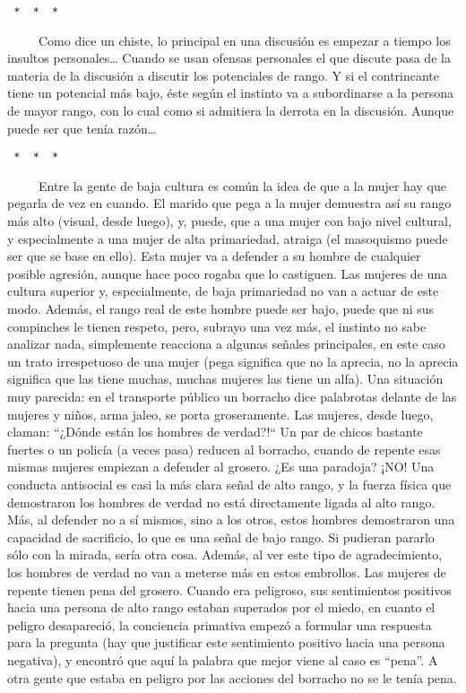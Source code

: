 \begin{verbatim}
 *  *  * 
\end{verbatim}

~ ~ ~ Como dice un chiste, lo principal en una discusión es empezar a
tiempo los insultos personales\ldots{} Cuando se usan ofensas personales
el que discute pasa de la materia de la discusión a discutir los
potenciales de rango. Y si el contrincante tiene un potencial más bajo,
éste según el instinto va a subordinarse a la persona de mayor rango,
con lo cual como si admitiera la derrota en la discusión. Aunque puede
ser que tenía razón\ldots{}

\begin{verbatim}
 *  *  * 
\end{verbatim}

~ ~ ~ Entre la gente de baja cultura es común la idea de que a la mujer
hay que pegarla de vez en cuando. El marido que pega a la mujer
demuestra así su rango más alto (visual, desde luego), y, puede, que a
una mujer con bajo nivel cultural, y especialmente a una mujer de alta
primariedad, atraiga (el masoquismo puede ser que se base en ello). Esta
mujer va a defender a su hombre de cualquier posible agresión, aunque
hace poco rogaba que lo castiguen. Las mujeres de una cultura superior
y, especialmente, de baja primariedad no van a actuar de este modo.
Además, el rango real de este hombre puede ser bajo, puede que ni sus
compinches le tienen respeto, pero, subrayo una vez más, el instinto no
sabe analizar nada, simplemente reacciona a algunas señales principales,
en este caso un trato irrespetuoso de una mujer (pega significa que no
la aprecia, no la aprecia significa que las tiene muchas, muchas mujeres
las tiene un alfa). Una situación muy parecida: en el transporte público
un borracho dice palabrotas delante de las mujeres y niños, arma jaleo,
se porta groseramente. Las mujeres, desde luego, claman: ``¿Dónde están
los hombres de verdad?!`` Un par de chicos bastante fuertes o un policía
(a veces pasa) reducen al borracho, cuando de repente esas mismas
mujeres empiezan a defender al grosero. ¿Es una paradoja? ¡NO! Una
conducta antisocial es casi la más clara señal de alto rango, y la
fuerza física que demostraron los hombres de verdad no está directamente
ligada al alto rango. Más, al defender no a sí mismos, sino a los otros,
estos hombres demostraron una capacidad de sacrificio, lo que es una
señal de bajo rango. Si pudieran pararlo sólo con la mirada, sería otra
cosa. Además, al ver este tipo de agradecimiento, los hombres de verdad
no van a meterse más en estos embrollos. Las mujeres de repente tienen
pena del grosero. Cuando era peligroso, sus sentimientos positivos hacia
una persona de alto rango estaban superados por el miedo, en cuanto el
peligro desapareció, la conciencia primativa empezó a formular una
respuesta para la pregunta (hay que justificar este sentimiento positivo
hacia una persona negativa), y encontró que aquí la palabra que mejor
viene al caso es ``pena''. A otra gente que estaba en peligro por las
acciones del borracho no se le tenía pena.

